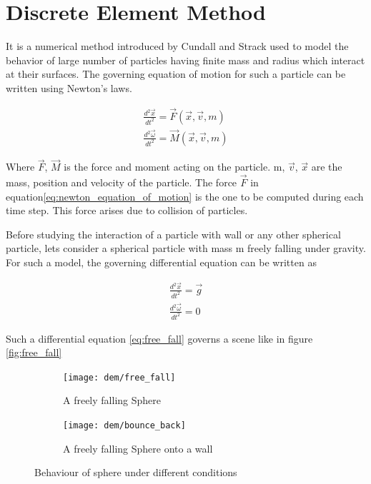 \chapter{Discrete Element Method}

It is a numerical method introduced by Cundall and Strack \citep{CS79}
used to model the behavior of large number of particles having finite
mass and radius which interact at their surfaces. The governing
equation of motion for such a particle can be written using Newton's
laws.

\begin{align}
  \label{eq:newton_equation_of_motion}
  \frac{d^2 \vec{x}}{dt^2} = \vec{F}(\vec{x}, \vec{v}, m)\\
  \frac{d^2 \vec{\omega}}{dt^2} = \vec{M}(\vec{x}, \vec{v}, m)
\end{align}

Where $\vec{F}$, $\vec{M}$ is the force and moment acting on the
particle. m, $\vec{v}$, $\vec{x}$ are the mass, position and velocity
of the particle.
The force $\vec{F}$ in equation\ref{eq:newton_equation_of_motion} is
the one to be computed during each time step. This force arises due to
collision of particles.


Before studying the interaction of a particle with wall or any other
spherical particle, lets consider a spherical particle with mass m
freely falling under gravity. For such a model, the governing
differential equation can be written as

\begin{align}
  \label{eq:free_fall}
  \frac{d^2 \vec{x}}{dt^2} = \vec{g}\\
  \frac{d^2 \vec{\omega}}{dt^2} = 0
\end{align}

Such a differential equation \eqref{eq:free_fall} governs a scene like
in figure \eqref{fig:free_fall}

\begin{figure}
\centering
\begin{subfigure}{.5\textwidth}
  \centering
  \texttt{[image: dem/free\_fall]}
  \caption{A freely falling Sphere}
  \label{fig:free_fall}
\end{subfigure}%
\begin{subfigure}{.5\textwidth}
  \centering
  \texttt{[image: dem/bounce\_back]}
  \caption{A freely falling Sphere onto a wall}
  \label{fig:bounce_back}
\end{subfigure}
\caption{Behaviour of sphere under different conditions}
\label{fig:sphere_intro}
\end{figure}


